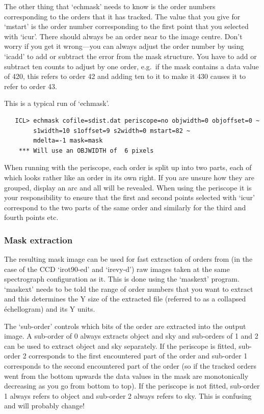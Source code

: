 \documentclass[11pt,twoside]{article}
\newcommand{\latorhtm}[2]{#1}
\newcommand{\latorhtm}[2]{#2}
\begin{document}
   The other thing that `echmask' needs to know is the order numbers
   corresponding to the orders that it has tracked. The value that you
   give for `mstart' is the order number corresponding to the first
   point that you selected with `icur'. There should always be an order
   near to the image centre. Don't worry if you get it
   wrong\latorhtm{---}{-}you can
   always adjust the order number by using `icadd' to add or subtract
   the error from the mask structure. You have to add or subtract ten
   counts to adjust by one order, e.g.\ if the mask contains a data value
   of 420, this refers to order 42 and adding ten to it to make it 430
   causes it to refer to order 43.

   This is a typical run of `echmask'.

\begin{verbatim}
   ICL> echmask cofile=sdist.dat periscope=no objwidth=0 objoffset=0 ~
        s1width=10 s1offset=9 s2width=0 mstart=82 ~
        mdelta=-1 mask=mask
    *** Will use an OBJWIDTH of  6 pixels
\end{verbatim}

   When running with the periscope, each order is split up into two
   parts, each of which looks rather like an order in its own right. If
   you are unsure how they are grouped, display an arc and all will be
   revealed. When using the periscope it is your responsibility to
   ensure that the first and second points selected with `icur'
   correspond to the two parts of the same order and similarly for the
   third and fourth points etc.


\subsubsection{Mask extraction}

   The resulting mask image can be used for fast extraction of orders
   from (in the case of the CCD `irot90-ed' and `irevy-d') raw images
   taken at the same spectrograph configuration as it. This is done
   using the `maskext' program. `maskext' needs to be told the range
   of order numbers that you want to extract and this determines the Y
   size of the extracted file (referred to as a collapsed \'echellogram)
   and its Y units.

   The `sub-order' controls which bits of the order are extracted into
   the output image. A sub-order of 0 always extracts object and sky and
   sub-orders of 1 and 2 can be used to extract object and sky
   separately. If the periscope is fitted, sub-order 2 corresponds to
   the first encountered part of the order and sub-order 1 corresponds
   to the second encountered part of the order (so if the tracked orders
   went from the bottom upwards the data values in the mask are
   monotonically decreasing as you go from bottom to top). If the
   periscope is not fitted, sub-order 1 always refers to object and
   sub-order 2 always refers to sky. This is confusing and will probably
   change!
\end{document}
